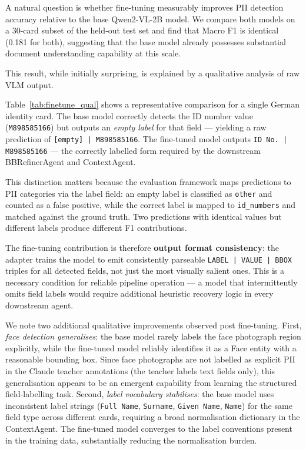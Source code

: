 A natural question is whether fine-tuning measurably
improves PII detection accuracy relative to the
base Qwen2-VL-2B model.
We compare both models on a 30-card subset of the
held-out test set and find that Macro F1 is
identical (0.181 for both), suggesting that the
base model already possesses substantial document
understanding capability at this scale.

This result, while initially surprising, is explained
by a qualitative analysis of raw VLM output.



Table~\ref{tab:finetune_qual} shows a representative
comparison for a single German identity card.
The base model correctly detects the ID number value
(\texttt{M898585166}) but outputs an \emph{empty
label} for that field --- yielding a raw prediction
of \texttt{[empty] | M898585166}.
The fine-tuned model outputs \texttt{ID No. |
M898585166} --- the correctly labelled form required
by the downstream BBRefinerAgent and ContextAgent.

This distinction matters because the evaluation
framework maps predictions to PII categories via
the label field: an empty label is classified as
\texttt{other} and counted as a false positive,
while the correct label is mapped to
\texttt{id\_numbers} and matched against the ground
truth.
Two predictions with identical values but different
labels produce different F1 contributions.

The fine-tuning contribution is therefore
\textbf{output format consistency}: the adapter
trains the model to emit consistently parseable
\texttt{LABEL\,|\,VALUE\,|\,BBOX} triples for all
detected fields, not just the most visually salient
ones.
This is a necessary condition for reliable pipeline
operation --- a model that intermittently omits field
labels would require additional heuristic recovery
logic in every downstream agent.

We note two additional qualitative improvements
observed post fine-tuning.
First, \emph{face detection generalises}: the base
model rarely labels the face photograph region
explicitly, while the fine-tuned model reliably
identifies it as a Face entity with a reasonable
bounding box.
Since face photographs are not labelled as explicit
PII in the Claude teacher annotations (the teacher
labels text fields only), this generalisation appears
to be an emergent capability from learning the
structured field-labelling task.
Second, \emph{label vocabulary stabilises}: the base
model uses inconsistent label strings (\texttt{Full
Name}, \texttt{Surname}, \texttt{Given Name},
\texttt{Name}) for the same field type across
different cards, requiring a broad normalisation
dictionary in the ContextAgent.
The fine-tuned model converges to the label
conventions present in the training data,
substantially reducing the normalisation burden.

